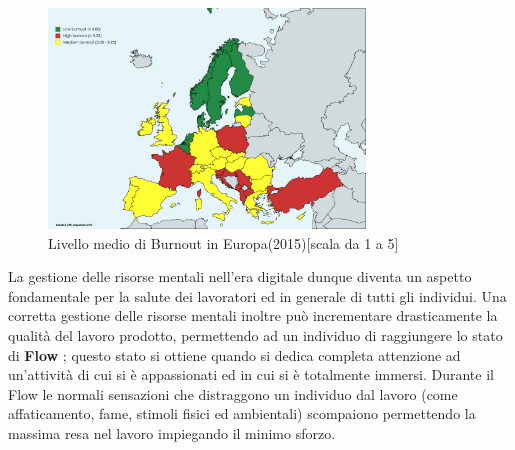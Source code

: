 \begin{figure}[H]
  \centering
  \includegraphics[width=0.75\textwidth]{img/burnout_eu_2015.png}
  \caption{Livello medio di Burnout in Europa(2015)[scala da 1 a 5] \cite{burnout_europa}}
\end{figure}
\vspace{15mm}
La gestione delle risorse mentali nell'era digitale dunque diventa un aspetto fondamentale per la salute dei lavoratori ed in generale di tutti gli individui.\newline
Una corretta gestione delle risorse mentali inoltre può incrementare drasticamente la qualità del lavoro prodotto, permettendo ad un individuo di raggiungere lo stato di {\bf Flow} \cite{flow}; questo stato si ottiene quando si dedica completa attenzione ad un'attività di cui si è appassionati ed in cui si è totalmente immersi.\newline
Durante il Flow le normali sensazioni che distraggono un individuo dal lavoro (come affaticamento, fame, stimoli fisici ed ambientali) scompaiono permettendo la massima resa nel lavoro impiegando il minimo sforzo.
